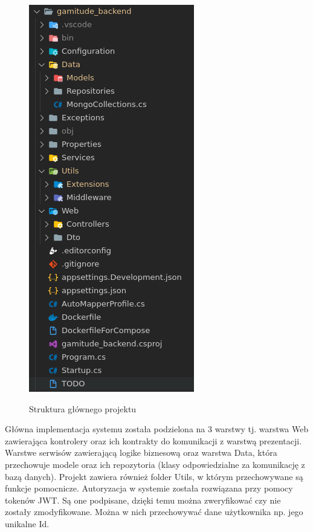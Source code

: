 \documentclass[a4paper,11pt]{report}
\begin{document}
\begin{figure}[H]
	\centering
	\includegraphics[scale=0.5]{implementacja/backend/struktura_folderow_gamitude_backend}\\
	\caption{Struktura głównego projektu}
	\label{fig:gamitude_struct}
\end{figure}
Główna implementacja systemu została podzielona na 3 warstwy tj. warstwa Web zawierająca kontrolery oraz ich kontrakty do komunikacji z warstwą prezentacji.
Warstwe serwisów zawierającą logike biznesową oraz warstwa Data, która przechowuje modele oraz ich repozytoria (klasy odpowiedzialne za komunikację z bazą danych).
Projekt zawiera również folder Utils, w którym przechowywane są funkcje pomocnicze. Autoryzacja w systemie została rozwiązana przy pomocy tokenów JWT.
Są one podpisane, dzięki temu można zweryfikować czy nie zostały zmodyfikowane. Można w nich przechowywać dane użytkownika np. jego unikalne Id.
\end{document}
